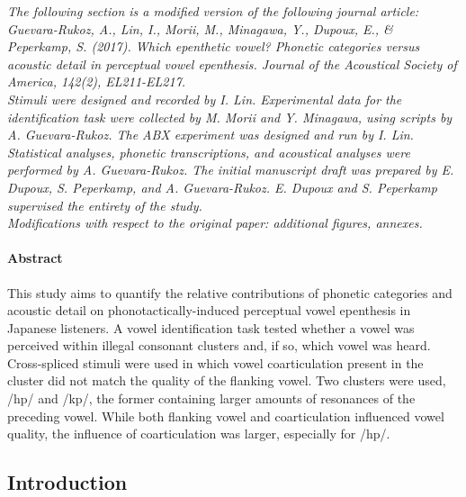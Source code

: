 \small{\textit{{\color{darkgray}The following section is a modified version of the following journal article: \\
Guevara-Rukoz, A., Lin, I., Morii, M., Minagawa, Y., Dupoux, E., \& Peperkamp, S. (2017). Which epenthetic vowel? Phonetic categories versus acoustic detail in perceptual vowel epenthesis. Journal of the Acoustical Society of America, 142(2), EL211-EL217. \\
Stimuli were designed and recorded by I. Lin.
Experimental data for the identification task were collected by M. Morii and Y. Minagawa, using scripts by A. Guevara-Rukoz. The ABX experiment was designed and run by I. Lin.
Statistical analyses, phonetic transcriptions, and acoustical analyses were performed by A. Guevara-Rukoz.
The initial manuscript draft was prepared by E. Dupoux, S. Peperkamp, and A. Guevara-Rukoz.
E. Dupoux and S. Peperkamp supervised the entirety of the study.\\
Modifications with respect to the original paper: additional figures, annexes.\\}}}
\paragraph{Abstract}

This study aims to quantify the relative contributions of phonetic categories and acoustic detail on phonotactically-induced perceptual vowel epenthesis in Japanese listeners. A vowel identification task tested whether a vowel was perceived within illegal consonant clusters and, if so, which vowel was heard. Cross-spliced stimuli were used in which vowel coarticulation present in the cluster did not match the quality of the flanking vowel. Two clusters were used, /hp/ and /kp/, the former containing larger amounts of resonances of the preceding vowel. While both flanking vowel and coarticulation influenced vowel quality, the influence of coarticulation was larger, especially for /hp/.

\subsection{Introduction}

\setlength{\parindent}{5ex}

